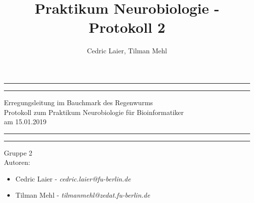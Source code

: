 \documentclass[a4paper]{article}
\title{Praktikum Neurobiologie - Protokoll 2}
\author{Cedric Laier, Tilman Mehl}
\begin{document}
\begin{titlepage} %

	\centering %
	
	\scshape %
	
	\vspace*{\baselineskip} %
	
	
	\rule{\textwidth}{1.6pt}\vspace*{-\baselineskip}\vspace*{2pt} %
	\rule{\textwidth}{0.4pt} %
	\vspace{0.75\baselineskip} %
	{\LARGE Erregungsleitung im Bauchmark des Regenwurms} {\\Protokoll zum Praktikum Neurobiologie für Bioinformatiker\\ am 15.01.2019} %

	
	\vspace{0.75\baselineskip} %
	
	\rule{\textwidth}{0.4pt}\vspace*{-\baselineskip}\vspace{3.2pt} %
	\rule{\textwidth}{1.6pt} %
	
	\vspace{2\baselineskip} %
	
	\vspace{2.0\baselineskip} %

{\LARGE Gruppe 2}
\vspace{2.5\baselineskip} \\
	
{\LARGE Autoren:}
\begin{itemize}
\item Cedric Laier - \textit{cedric.laier@fu-berlin.de}
\item Tilman Mehl - \textit{tilmanmehl@zedat.fu-berlin.de}
\end{itemize}
\vspace{2.5\baselineskip}


\end{titlepage}
\end{document}
